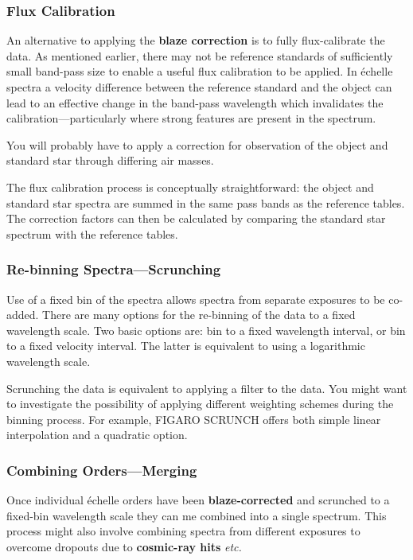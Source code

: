 \documentclass[twoside,11pt]{article}
\newcommand{\htmlref}[2]{#1}
\newcommand{\xref}[3]{#1}
\newcommand{\sgspec}[2]{#1}
\newcommand{\sgspec}[2]{#2}
\begin{document}
\subsubsection{Flux Calibration}

An alternative to applying the \htmlref{{\bf blaze correction}}
{gl_blaze_correction} is to fully flux-calibrate the data.
As mentioned earlier, there may not be reference
standards of sufficiently small band-pass size to enable a useful flux
calibration to be applied.  In \'{e}chelle spectra a velocity difference
between the reference standard and the object can lead to an effective
change in the band-pass wavelength which invalidates the
calibration\sgspec{---}{ - }particularly where strong features are
present in the spectrum.

You will probably have to apply a correction for observation of the
object and standard star through differing air masses.

The flux calibration process is conceptually straightforward: the object and
standard star spectra are summed in the same pass bands as the reference
tables.  The correction factors can then be calculated by comparing the
standard star spectrum with the reference tables.

\subsubsection{Re-binning Spectra\sgspec{---}{ - }Scrunching}

Use of a fixed bin of the spectra allows spectra from separate exposures
to be co-added.
There are many options for the re-binning of the data to a fixed
wavelength scale.  Two basic options are: bin to a fixed wavelength
interval, or bin to a fixed velocity interval.  The latter is
equivalent to using a logarithmic wavelength scale.

Scrunching the data is equivalent to applying a filter to the data.
You might want to investigate the possibility of applying different
weighting schemes during the binning process.
For example, \xref{FIGARO}{sun86}{} \xref{SCRUNCH}{sun86}{SCRUNCH}
offers both simple linear interpolation and a quadratic option.

\subsubsection{Combining Orders\sgspec{---}{ - }Merging}

Once individual \'{e}chelle orders have been
\htmlref{{\bf blaze-corrected}}{gl_blaze_correction} and scrunched
to a fixed-bin wavelength scale they can me combined into a single spectrum.
This process might also involve combining spectra from different exposures
to overcome dropouts due to \htmlref{{\bf cosmic-ray hits}}{cosmic_ray}
{\em etc.}
\end{document}
